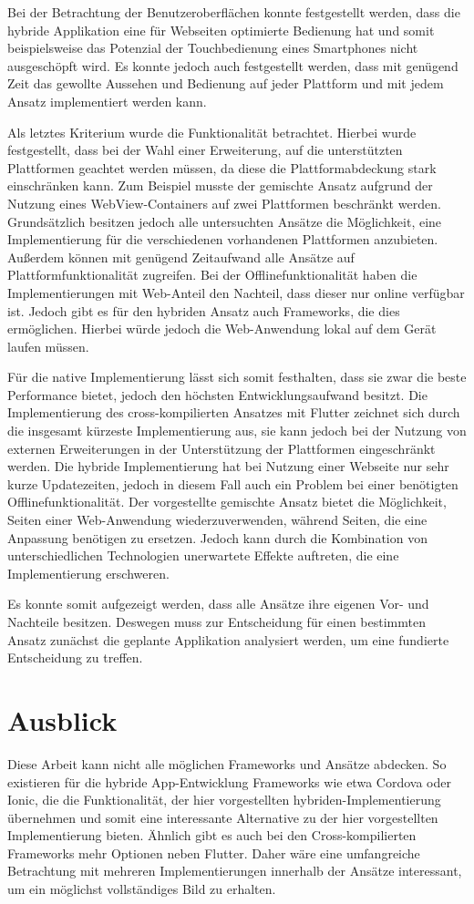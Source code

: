 Bei der Betrachtung der Benutzeroberflächen konnte festgestellt werden, dass die hybride Applikation eine für Webseiten optimierte Bedienung hat und somit beispielsweise das Potenzial der Touchbedienung eines Smartphones nicht ausgeschöpft wird. Es konnte jedoch auch festgestellt werden, dass mit genügend Zeit das gewollte Aussehen und Bedienung auf jeder Plattform und mit jedem Ansatz implementiert werden kann.

Als letztes Kriterium wurde die Funktionalität betrachtet. Hierbei wurde festgestellt, dass bei der Wahl einer Erweiterung, auf die unterstützten Plattformen geachtet werden müssen, da diese die Plattformabdeckung stark einschränken kann. Zum Beispiel musste der gemischte Ansatz aufgrund der Nutzung eines WebView-Containers auf zwei Plattformen beschränkt werden. Grundsätzlich besitzen jedoch alle untersuchten Ansätze die Möglichkeit, eine Implementierung für die verschiedenen vorhandenen Plattformen anzubieten. Außerdem können mit genügend Zeitaufwand alle Ansätze auf Plattformfunktionalität zugreifen. Bei der Offlinefunktionalität haben die Implementierungen mit Web-Anteil den Nachteil, dass dieser nur online verfügbar ist. Jedoch gibt es für den hybriden Ansatz auch Frameworks, die dies ermöglichen. Hierbei würde jedoch die Web-Anwendung lokal auf dem Gerät laufen müssen.

Für die native Implementierung lässt sich somit festhalten, dass sie zwar die beste Performance bietet, jedoch den höchsten Entwicklungsaufwand besitzt.
Die Implementierung des cross-kompilierten Ansatzes mit Flutter zeichnet sich durch die insgesamt kürzeste Implementierung aus, sie kann jedoch bei der Nutzung von externen Erweiterungen in der Unterstützung der Plattformen eingeschränkt werden. Die hybride Implementierung hat bei Nutzung einer Webseite nur sehr kurze Updatezeiten, jedoch in diesem Fall auch ein Problem bei einer benötigten Offlinefunktionalität. Der vorgestellte gemischte Ansatz bietet die Möglichkeit, Seiten einer Web-Anwendung wiederzuverwenden, während Seiten, die eine Anpassung benötigen zu ersetzen. Jedoch kann durch die Kombination von unterschiedlichen Technologien unerwartete Effekte auftreten, die eine Implementierung erschweren.

Es konnte somit aufgezeigt werden, dass alle Ansätze ihre eigenen Vor- und Nachteile besitzen. Deswegen muss zur Entscheidung für einen bestimmten Ansatz zunächst die geplante Applikation analysiert werden, um eine fundierte Entscheidung zu treffen.


\section{Ausblick}
Diese Arbeit kann nicht alle möglichen Frameworks und Ansätze abdecken. So existieren für die hybride App-Entwicklung Frameworks wie etwa Cordova oder Ionic, die die Funktionalität, der hier vorgestellten hybriden-Implementierung übernehmen und somit eine interessante Alternative zu der hier vorgestellten Implementierung bieten. Ähnlich gibt es auch bei den Cross-kompilierten Frameworks mehr Optionen neben Flutter. Daher wäre eine umfangreiche Betrachtung mit mehreren Implementierungen innerhalb der Ansätze interessant, um ein möglichst vollständiges Bild zu erhalten.

